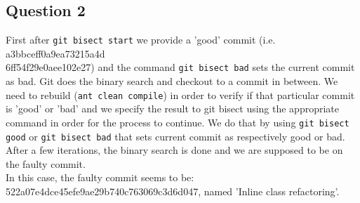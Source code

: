 \subsection*{Question 2}
\noindent First after \verb|git bisect start| we provide a 'good' commit (i.e. a3bbceff0a9ea73215a4d\\6ff54f29e0aee102e27) and the command \verb|git bisect bad| sets the current commit as bad. Git does the binary search and checkout to a commit in between. We need to rebuild (\verb|ant clean compile|) in order to verify if that particular commit is 'good' or 'bad' and we specify the result to git bisect using the appropriate command in order for the process to continue. We do that by using \verb|git bisect good| or \verb|git bisect bad| that sets current commit as respectively good or bad. After a few iterations, the binary search is done and we are supposed to be on the faulty commit. \\ In this case, the faulty commit seems to be: 522a07e4dce45efe9ae29b740c763069c3d6d047, named 'Inline class refactoring'.
